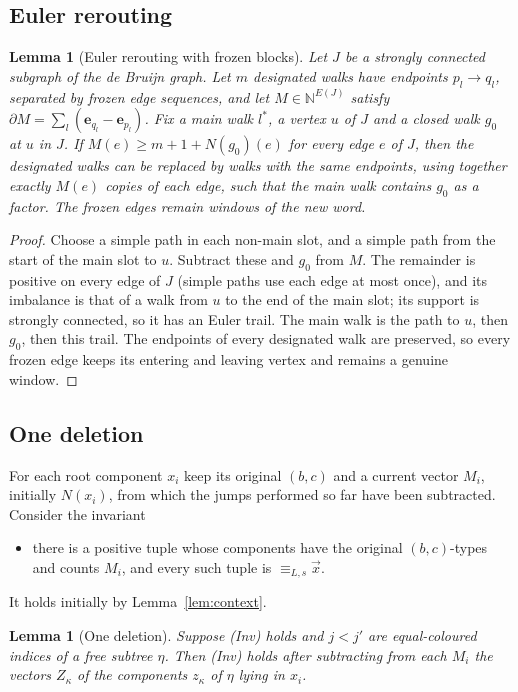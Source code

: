 \documentclass[11pt]{article}
\numberwithin{equation}{section}
\theoremstyle{plain}
\newtheorem{lemma}[theorem]{Lemma}
\theoremstyle{definition}
\theoremstyle{remark}
\theoremstyle{plain}
\newcommand{\tuple}[1]{\vec{#1}}
\begin{document}
\subsection{Euler rerouting}

\begin{lemma}[Euler rerouting with frozen blocks]
\label{lem:euler}
Let $J$ be a strongly connected subgraph of the de Bruijn graph.  Let $m$
designated walks have endpoints $p_l\to q_l$, separated by frozen edge
sequences, and let $M\in\mathbb N^{E(J)}$ satisfy
$\partial M=\sum_l(\mathbf e_{q_l}-\mathbf e_{p_l})$.  Fix a main walk $l^*$, a
vertex $u$ of $J$ and a closed walk $g_0$ at $u$ in $J$.  If
$M(e)\ge m+1+N(g_0)(e)$ for every edge $e$ of $J$, then the designated walks can
be replaced by walks with the same endpoints, using together exactly $M(e)$
copies of each edge, such that the main walk contains $g_0$ as a factor.  The
frozen edges remain windows of the new word.
\end{lemma}

\begin{proof}
Choose a simple path in each non-main slot, and a simple path from the start of
the main slot to $u$.  Subtract these and $g_0$ from $M$.  The remainder is
positive on every edge of $J$ (simple paths use each edge at most once), and its
imbalance is that of a walk from $u$ to the end of the main slot; its support is
strongly connected, so it has an Euler trail.  The main walk is the path to $u$,
then $g_0$, then this trail.  The endpoints of every designated walk are
preserved, so every frozen edge keeps its entering and leaving vertex and
remains a genuine window.
\end{proof}

\subsection{One deletion}

For each root component $x_i$ keep its original $(b,c)$ and a current vector
$M_i$, initially $N(x_i)$, from which the jumps performed so far have been
subtracted.  Consider the invariant
\begin{itemize}[leftmargin=*]
\item[(Inv)] there is a positive tuple whose components have the original
$(b,c)$-types and counts $M_i$, and every such tuple is $\equiv_{L,s}\tuple x$.
\end{itemize}
It holds initially by Lemma~\ref{lem:context}.

\begin{lemma}[One deletion]
\label{lem:deletion}
Suppose (Inv) holds and $j<j'$ are equal-coloured indices of a free subtree
$\eta$.  Then (Inv) holds after subtracting from each $M_i$ the vectors
$Z_\kappa$ of the components $z_\kappa$ of $\eta$ lying in $x_i$.
\end{lemma}
\end{document}
